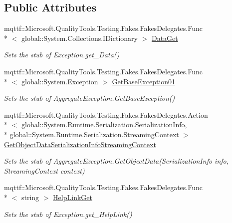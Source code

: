 \subsection*{Public Attributes}
\begin{DoxyCompactItemize}
\item 
mqttf\-::\-Microsoft.\-Quality\-Tools.\-Testing.\-Fakes.\-Fakes\-Delegates.\-Func\\*
$<$ global\-::\-System.\-Collections.\-I\-Dictionary $>$ \hyperlink{class_system_1_1_fakes_1_1_stub_aggregate_exception_ada4753fbcadff6de5942ac06fb9a1e48}{Data\-Get}
\begin{DoxyCompactList}\small\item\em Sets the stub of Exception.\-get\-\_\-\-Data()\end{DoxyCompactList}\item 
mqttf\-::\-Microsoft.\-Quality\-Tools.\-Testing.\-Fakes.\-Fakes\-Delegates.\-Func\\*
$<$ global\-::\-System.\-Exception $>$ \hyperlink{class_system_1_1_fakes_1_1_stub_aggregate_exception_a00c037c9965a75ae298dc835c3827f45}{Get\-Base\-Exception01}
\begin{DoxyCompactList}\small\item\em Sets the stub of Aggregate\-Exception.\-Get\-Base\-Exception()\end{DoxyCompactList}\item 
mqttf\-::\-Microsoft.\-Quality\-Tools.\-Testing.\-Fakes.\-Fakes\-Delegates.\-Action\\*
$<$ global\-::\-System.\-Runtime.\-Serialization.\-Serialization\-Info, \\*
global\-::\-System.\-Runtime.\-Serialization.\-Streaming\-Context $>$ \hyperlink{class_system_1_1_fakes_1_1_stub_aggregate_exception_acf3c4e74c7c03a0abb84bfbade5dba33}{Get\-Object\-Data\-Serialization\-Info\-Streaming\-Context}
\begin{DoxyCompactList}\small\item\em Sets the stub of Aggregate\-Exception.\-Get\-Object\-Data(\-Serialization\-Info info, Streaming\-Context context)\end{DoxyCompactList}\item 
mqttf\-::\-Microsoft.\-Quality\-Tools.\-Testing.\-Fakes.\-Fakes\-Delegates.\-Func\\*
$<$ string $>$ \hyperlink{class_system_1_1_fakes_1_1_stub_aggregate_exception_a3f314c9aa528c855000e78d45acc979e}{Help\-Link\-Get}
\begin{DoxyCompactList}\small\item\em Sets the stub of Exception.\-get\-\_\-\-Help\-Link()\end{DoxyCompactList}\item 

\end{DoxyCompactItemize}
